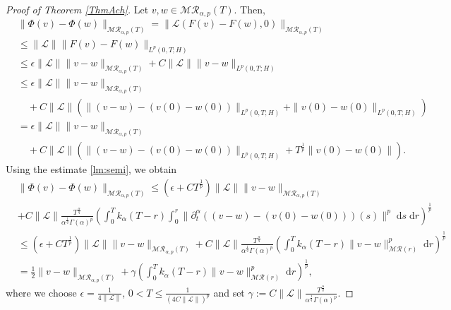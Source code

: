 \documentclass[10pt,a4paper]{amsart}
\def \d {\mathrm{d}}
\begin{document}
\begin{proof}[Proof of Theorem \ref{ThmAch}]
Let $v,w\in \mathcal{M}\mathcal{R}_{\alpha,p}(T)$. Then,
 \begin{align*}
     &\|\Phi(v)-\Phi(w)\|_{\mathcal{M}\mathcal{R}_{\alpha,p}(T)}= \|\mathcal{L}(F(v)-F(w),0)\|_{\mathcal{M}\mathcal{R}_{\alpha,p}(T)}\\
     &\le \|\mathcal{L}\| \|F(v)-F(w)\|_{L^p(0,T;H)}\\
     &\le \epsilon \|\mathcal{L}\|\|v-w\|_{\mathcal{M}\mathcal{R}_{\alpha,p}(T)}+C\|\mathcal{L}\|\|v-w\|_{L^p(0,T;H)}\\
     &\le \epsilon \|\mathcal{L}\|\|v-w\|_{\mathcal{M}\mathcal{R}_{\alpha,p}(T)}\\
     &\quad+C\|\mathcal{L}\|\left(\|(v-w)-(v(0)-w(0))\|_{L^p(0,T;H)}+ \|v(0)-w(0)\|_{L^p(0,T;H)}\right)\\
     &= \epsilon \|\mathcal{L}\|\|v-w\|_{\mathcal{M}\mathcal{R}_{\alpha,p}(T)}\\
     &\quad+C\|\mathcal{L}\|\left(\|(v-w)-(v(0)-w(0))\|_{L^p(0,T;H)}+ T^{\frac{1}{p}} \|v(0)-w(0)\|\right).
 \end{align*}
Using the estimate \eqref{lm:semi}, we obtain
\begin{align*}
     &\|\Phi(v)-\Phi(w)\|_{\mathcal{M}\mathcal{R}_{\alpha,p}(T)}\le (\epsilon +CT^{\frac{1}{p}})\|\mathcal{L}\|\|v-w\|_{\mathcal{M}\mathcal{R}_{\alpha,p}(T)}\\
     &+C \|\mathcal{L}\|\frac{T^{\frac{\alpha }{q}}}{\alpha^{\frac{1}{q}}\Gamma(\alpha)^p}\left(\int^T_0 k_{\alpha}(T-r)
		\int_0^r\|\partial_t^\alpha ((v-w)-(v(0)-w(0)))(s)\|^p\;\d s\;\d r\right)^{\frac{1}{p}} \\
    &\le (\epsilon +CT^{\frac{1}{p}})\|\mathcal{L} \|\|v-w\|_{\mathcal{M}\mathcal{R}_{\alpha,p}(T)}
     +C \|\mathcal{L}\|\frac{T^{\frac{\alpha }{q}}}{\alpha^{\frac{1}{q}}\Gamma(\alpha)^p}\left(\int^T_0 k_{\alpha}(T-r)
		\|v-w\|^p_{\mathcal{M}\mathcal{R}(r)}\;\d r\right)^{\frac{1}{p}}\\
        & =\frac{1}{2}\|v-w\|_{\mathcal{M}\mathcal{R}_{\alpha,p}(T)}
     + \gamma\left(\int^T_0 k_{\alpha}(T-r)
		\|v-w\|^p_{\mathcal{M}\mathcal{R}(r)}\;\d r\right)^{\frac{1}{p}},
 \end{align*}
 where we choose $\epsilon=\frac{1}{4\|\mathcal{L}\|}$, $0<T\le \frac{1}{(4 C\|\mathcal{L}\|)^p}$ and set $\gamma:=C \|\mathcal{L}\|\frac{T^{\frac{\alpha }{q}}}{\alpha^{\frac{1}{q}}\Gamma(\alpha)^p}$.
 

\end{proof}
\end{document}
